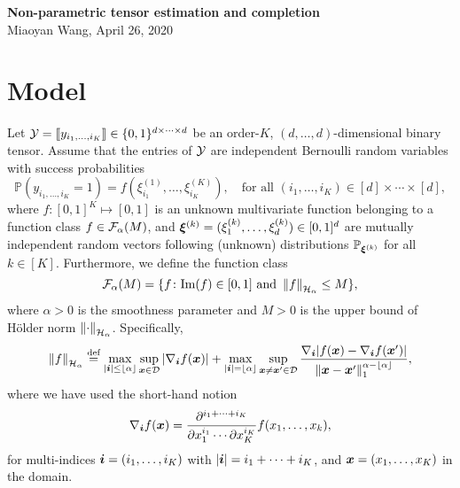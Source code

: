 \documentclass[11pt]{article}
\theoremstyle{plain}
\theoremstyle{definition}
\newcommand{\Hnorm}[1]{\left\lVert#1\right\rVert_{\tH_\alpha}}
\begin{document}
\begin{center}
{\bf \Large Non-parametric tensor estimation and completion}\\
Miaoyan Wang, April 26, 2020
\end{center}
\section{Model}

Let $\mathcal{Y}=\llbracket y_{i_1,\ldots,i_K} \rrbracket\in\{0,1\}^{d \times \cdots \times d}$ be an order-$K$, $(d,\ldots,d)$-dimensional binary tensor. Assume that the entries of $\mathcal{Y}$ are independent Bernoulli random variables with success probabilities
\[
\mathbb{P}\left(y_{i_1,\ldots,i_K}=1\right)=f\left(\xi^{(1)}_{i_1},\ldots,\xi^{(K)}_{i_K}\right),\quad \text{for all } (i_1,\ldots,i_K)\in[d]\times \cdots \times [d],
\]
where $f\colon [0,1]^K\mapsto [0,1]$ is an unknown multivariate function belonging to a function class $f\in \mathcal{F}_\alpha(M)$, and $\boldsymbol{\xi}^{(k)}=(\xi^{(k)}_1,\ldots,\xi^{(k)}_d)\in[0,1]^d$ are mutually independent random vectors following  (unknown) distributions $\mathbb{P}_{\boldsymbol{\xi}^{(k)}}$ for all $k\in[K]$. Furthermore, we define the function class
 \[ 
\tF_\alpha(M)=\{f\colon \text{Im}(f)\in[0,1]\ \text{and}\ \Hnorm{f}\leq M\},
\]
where $\alpha>0$ is the smoothness parameter and $M>0$ is the upper bound of H\"{o}lder norm $\Hnorm{\cdot}$. Specifically, 
\[
\Hnorm{f}\stackrel{\text{def}}{=}\max_{|\mi|\leq \lfloor \alpha \rfloor}\sup_{\mx \in \tD} |\nabla_{\mi} f(\mx)|+\max_{|\mi| =\lfloor \alpha \rfloor}\sup_{\mx\neq \mx' \in \tD} {\nabla_{\mi} |f(\mx)-\nabla_{\mi} f(\mx')|\over \onenorm{\mx-\mx'}^{\alpha-\lfloor \alpha \rfloor}},
\]
where we have used the short-hand notion
\[
 \nabla_{\bm{i}} f(\bm x) ={\partial^{i_1+\cdots+i_K}\over \partial x^{i_1}_1\cdots \partial x^{i_K}_K} f(x_1,\ldots,x_k),
\]
for multi-indices $\bm{i}=(i_1,\ldots,i_K)$ with $|\bm{i}|=i_1+\cdots+i_K$, and $\bm x=(x_1,\ldots,x_K)$ in the domain.


\end{document}
